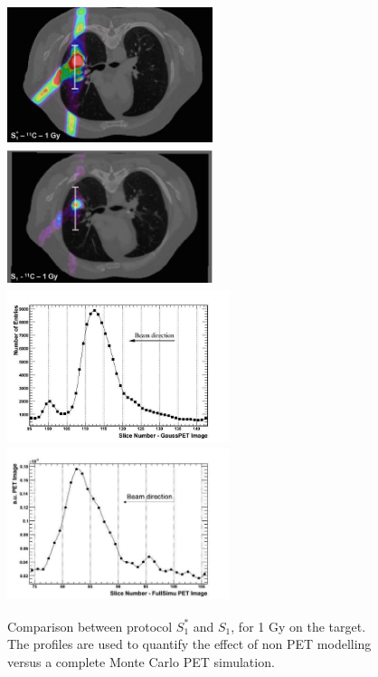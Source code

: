 \documentclass[11pt]{iopart}
\begin{document}
\begin{figure}[!h]
  \centering
  \includegraphics[width=6cm,height=40mm]{figures/gaussPET_C11_v2.jpg}
  \includegraphics[width=6cm,height=40mm]{figures/C11_1Gy_v2.jpg}
  \includegraphics[width=65mm,height=45mm]{figures/prof_gaussPET_C11_v1.jpg}
  \includegraphics[width=65mm,height=45mm]{figures/1GyFullPET_v1.jpg}
  \caption{Comparison between protocol $S_{1}^{*}$ and $S_{1}$, for 1 Gy on the target. The profiles are used to quantify the effect of non PET modelling versus a complete Monte Carlo PET simulation.}
  \label{fig:fig3}
\end{figure}
\end{document}
